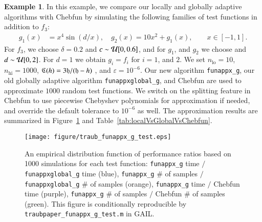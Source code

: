 \documentclass[review]{elsarticle}
\newcommand{\abstol}{\varepsilon}
\theoremstyle{definition}
\newtheorem{exmp}{Example}
\newcommand{\funappxg}{\texttt{funappx\_g}\xspace}
\newcommand{\funappxglobalg}{\texttt{funappxglobal\_g}\xspace}
\begin{document}

\begin{exmp}
In this example, we compare our locally and globally adaptive algorithms with Chebfun by
simulating the following families of test functions  in addition to $f_3$:
%
\begin{align*}
 g_1(x) &= x^4 \sin(d/x), \quad
 g_2(x) = 10  x^2 + g_1(x), \qquad x \in [-1, 1].
\end{align*}
For $f_3$, we choose $\delta = 0.2$ and $c \sim \mathcal{U}[0,0.6]$, and for $g_1$, and
$g_2$ we choose and $d \sim \mathcal{U}[0,2]$. For $d=1$ we obtain $g_i = f_i$ for
$i=1$, and $2$. We set $n_{\text{lo}} = 10$, $n_{\text{hi}} = 1000$, $\mathfrak{C} (h) =
3 \mathfrak{h}/(\mathfrak{h}-h)$ , and $\abstol = 10^{-6}$. Our new algorithm \texttt{funappx\_g},
our old globally adaptive algorithm \texttt{funappxglobal\_g}, and Chebfun are
used to approximate $1000$ random test functions. We switch on the splitting
feature in Chebfun to use piecewise Chebyshev polynomials for approximation if
needed, and override the default tolerance to $10^{-6}$ as well. The
approximation results are summarized in Figure~\ref{fig:testfunctions} and
Table~\ref{tab:localVsGlobalVsChebfun}.

%
\begin{figure}[tb]
  \centering
\texttt{[image: figure/traub\_funappx\_g\_test.eps]}
\caption{An empirical distribution function of performance ratios based on 1000
simulations for each test function: \funappxg{} time $/$ \funappxglobalg{} time
(blue), \funappxg{} \# of samples $/$ \funappxglobalg{} \# of samples (orange),
\funappxg{} time $/$ Chebfun time (purple), \funappxg{} \# of samples $/$
Chebfun \# of samples (green). This figure is conditionally reproducible by
\texttt{traubpaper\_funappx\_g\_test.m} in GAIL.}
\label{fig:testfunctions}
\end{figure}


\end{exmp}
\end{document}
